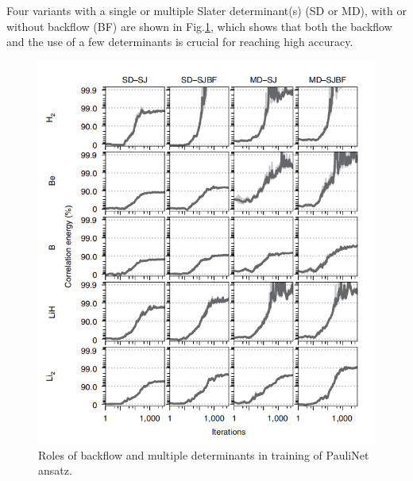 \documentclass[12pt]{article}
\begin{document}
Four variants with a single or multiple Slater determinant(s) (SD or MD), 
with or without backflow (BF) are shown in Fig.\ref{img4}, which shows that both 
the backflow and the use of a few determinants is crucial for reaching high accuracy.
\begin{figure}[H]
    \centering
    \includegraphics[width=13cm]{p4.png}
    \renewcommand{\figurename}{Fig.}
    \caption{Roles of backflow and multiple determinants in training of PauliNet 
    ansatz.}
    \label{img4}
\end{figure}
\end{document}
